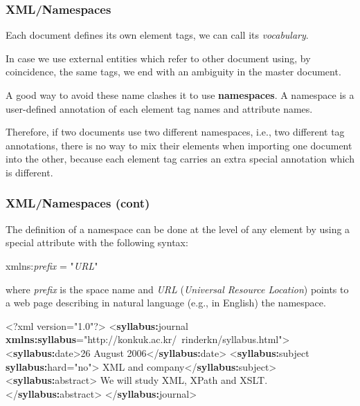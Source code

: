 %
\begin{frame}
\frametitle{XML/Namespaces}

Each \XML document defines its own element tags, we can call its
\emph{vocabulary}. 

\bigskip

In case we use external entities which refer to other \XML document
using, by coincidence, the same tags, we end with an ambiguity in the
master document.

\bigskip

A good way to avoid these name clashes it to use
\textbf{namespaces}. A namespace is a user-defined annotation of each
element tag names and attribute names.

\bigskip

Therefore, if two \XML documents use two different namespaces, i.e.,
two different tag annotations, there is no way to mix their elements
when importing one document into the other, because each element tag
carries an extra special annotation which is different.

\end{frame}

%
\begin{frame}[containsverbatim]
\frametitle{XML/Namespaces (cont)}

The definition of a namespace can be done at the level of any element
by using a special attribute with the following syntax:
{\small
\begin{semiverbatim}
xmlns:\textit{prefix} = "\textit{URL}"
\end{semiverbatim}
}
where \emph{prefix} is the space name and \emph{URL} (\emph{Universal
  Resource Location}) points to a web page describing in natural
language (e.g., in English) the namespace.
{\small
\begin{semiverbatim}
<?xml version="1.0"?>
<\textbf{syllabus:}journal
 \textbf{xmlns:syllabus}="http://konkuk.ac.kr/~rinderkn/syllabus.html">
 <\textbf{syllabus:}date>26 August 2006</\textbf{syllabus:}date>
 <\textbf{syllabus:}subject \textbf{syllabus:}hard="no">
   XML and company</\textbf{syllabus:}subject>
 <\textbf{syllabus:}abstract>
   We will study XML, XPath and XSLT.</\textbf{syllabus:}abstract>
</\textbf{syllabus:}journal>
\end{semiverbatim}
}

\end{frame}


